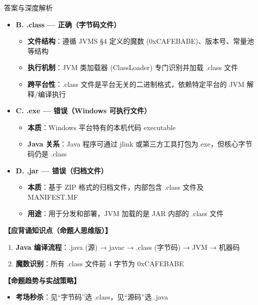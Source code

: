 ﻿\documentclass[12pt, a4paper]{ctexart}
\begin{document}
\begin{enumerate}[label=\textbf{\arabic*.}, leftmargin=*, itemsep=1.5em]
\begin{bluebox}{答案与深度解析}
\begin{itemize}[leftmargin=*, nosep]
			      \item \textbf{B. .class — 正确（字节码文件）}
			            \begin{itemize}[leftmargin=*, nosep]
				            \item \textbf{文件结构}：遵循 JVMS §4 定义的魔数 (0xCAFEBABE)、版本号、常量池等结构
				            \item \textbf{执行机制}：JVM 类加载器 (ClassLoader) 专门识别并加载 .class 文件
				            \item \textbf{跨平台性}：.class 文件是平台无关的二进制格式，依赖特定平台的 JVM 解释/编译执行
			            \end{itemize}

			      \item \textbf{C. .exe — 错误（Windows 可执行文件）}
			            \begin{itemize}[leftmargin=*, nosep]
				            \item \textbf{本质}：Windows 平台特有的本机代码 executable
				            \item \textbf{Java 关系}：Java 程序可通过 jlink 或第三方工具打包为 exe，但核心字节码仍是 .class
			            \end{itemize}

			      \item \textbf{D. .jar — 错误（归档文件）}
			            \begin{itemize}[leftmargin=*, nosep]
				            \item \textbf{本质}：基于 ZIP 格式的归档文件，内部包含 .class 文件及 MANIFEST.MF
				            \item \textbf{用途}：用于分发和部署，JVM 加载的是 JAR 内部的 .class 文件
			            \end{itemize}
		      \end{itemize}

		      \textbf{【应背诵知识点（命题人思维版）】}
		      \begin{enumerate}[leftmargin=*, nosep]
			      \item \textbf{Java 编译流程}：.java (源) → javac → .class (字节码) → JVM → 机器码
			      \item \textbf{魔数识别}：所有 .class 文件前 4 字节为 0xCAFEBABE
		      \end{enumerate}

		      \textbf{【命题趋势与实战策略】}
		      \begin{itemize}[leftmargin=*, nosep]
			      \item \textbf{考场秒杀}：见“字节码”选 .class，见“源码”选 .java
		      \end{itemize}
	      \end{bluebox}


\end{enumerate}
\end{document}
